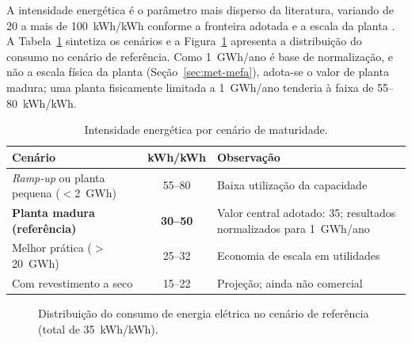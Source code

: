 A intensidade energética é o parâmetro mais disperso da literatura, variando de
20 a mais de 100~kWh/kWh conforme a fronteira adotada e a escala da planta
\cite{degen2022,erakca2021}. A Tabela~\ref{tab:giga-intensidade} sintetiza os
cenários e a Figura~\ref{fig:giga-energia} apresenta a distribuição do consumo no
cenário de referência. Como 1~GWh/ano é base de normalização, e não a escala
física da planta (Seção~\ref{sec:met-mefa}), adota-se o valor de planta madura;
uma planta fisicamente limitada a 1~GWh/ano tenderia à faixa de 55--80~kWh/kWh.

\begin{table}[H]
\centering
\caption{Intensidade energética por cenário de maturidade.}
\label{tab:giga-intensidade}
\small
\renewcommand{\arraystretch}{1.15}
\begin{tabularx}{\textwidth}{@{} >{\raggedright\arraybackslash}p{5.6cm} c X @{}}
\toprule
\textbf{Cenário} & \textbf{kWh/kWh} & \textbf{Observação} \\
\midrule
\textit{Ramp-up} ou planta pequena ($<$2~GWh) & 55--80 & Baixa utilização da capacidade \\
\textbf{Planta madura (referência)} & \textbf{30--50} & Valor central adotado: 35; resultados normalizados para 1~GWh/ano \\
Melhor prática ($>$20~GWh) & 25--32 & Economia de escala em utilidades \\
Com revestimento a seco & 15--22 & Projeção; ainda não comercial \\
\bottomrule
\end{tabularx}
\end{table}

\begin{figure}[H]
\centering
{}
\caption{Distribuição do consumo de energia elétrica no cenário de referência
         (total de 35~kWh/kWh).}
\label{fig:giga-energia}
\end{figure}

